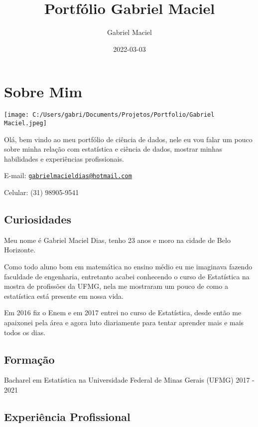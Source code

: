 \documentclass[
]{book}
\title{Portfólio Gabriel Maciel}
\author{Gabriel Maciel}
\date{2022-03-03}
\begin{document}
\maketitle

{
\setcounter{tocdepth}{1}
\tableofcontents
}
\hypertarget{sobre-mim}{%
\chapter{Sobre Mim}\label{sobre-mim}}

\texttt{[image: C:/Users/gabri/Documents/Projetos/Portfolio/Gabriel Maciel.jpeg]}

Olá, bem vindo ao meu portfólio de ciência de dados, nele eu vou falar um pouco sobre minha relação com estatística e ciência de dados, mostrar minhas habilidades e experiências profissionais.

E-mail: \href{mailto:gabrielmacieldias@hotmail.com}{\nolinkurl{gabrielmacieldias@hotmail.com}}

Celular: (31) 98905-9541

\hypertarget{curiosidades}{%
\section{Curiosidades}\label{curiosidades}}

Meu nome é Gabriel Maciel Dias, tenho 23 anos e moro na cidade de Belo Horizonte.

Como todo aluno bom em matemática no ensino médio eu me imaginava fazendo faculdade de engenharia, entretanto acabei conhecendo o curso de Estatística na mostra de profissões da UFMG, nela me mostraram um pouco de como a estatística está presente em nossa vida.

Em 2016 fiz o Enem e em 2017 entrei no curso de Estatística, desde então me apaixonei pela área e agora luto diariamente para tentar aprender mais e mais todos os dias.

\hypertarget{formauxe7uxe3o}{%
\section{Formação}\label{formauxe7uxe3o}}

Bacharel em Estatística na Universidade Federal de Minas Gerais (UFMG) 2017 - 2021

\hypertarget{experiuxeancia-profissional}{%
\section{Experiência Profissional}\label{experiuxeancia-profissional}}
\end{document}
